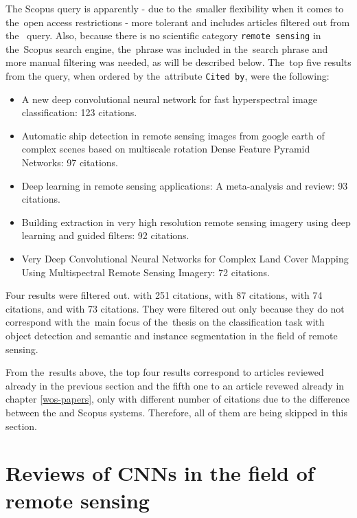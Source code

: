 \noindent The Scopus query is apparently - due to the~smaller flexibility when it comes to the~open access restrictions - more tolerant and includes articles filtered out from the~ query. Also, because there is no scientific category \verb|remote sensing| in the~Scopus search engine, the~phrase was included in the~search phrase and more manual filtering was needed, as will be described below. The~top five results from the query, when ordered by the~attribute \verb|Cited by|, were the following:

\begin{itemize}
	\item A new deep convolutional neural network for fast hyperspectral image classification: 123 citations.  \cite{cnn-hs-class}
	\item Automatic ship detection in remote sensing images from google earth of complex scenes based on multiscale rotation Dense Feature Pyramid Networks: 97 citations. \cite{ship-rdfpn}
	\item Deep learning in remote sensing applications: A meta-analysis and review: 93 citations. \cite{dl-remote-sensing-review}
	\item Building extraction in very high resolution remote sensing imagery using deep learning and guided filters: 92 citations. \cite{res-u-net}
	\item Very Deep Convolutional Neural Networks for Complex Land Cover Mapping Using Multispectral Remote Sensing Imagery: 72 citations. \cite{very-deep-cnn-lc}
\end{itemize}

Four results were filtered out. \cite{dl-for-cv} with 251 citations, \cite{dl-lungs} with 87 citations, \cite{maoxian-landslide} with 74 citations, and \cite{state-of-the-art-dl} with 73 citations. They were filtered out only because they do not correspond with the~main focus of the~thesis on the classification task with object detection and semantic and instance segmentation in the field of remote sensing.

From the~results above, the top four results correspond to articles reviewed already in the previous section and the fifth one to an article revewed already in chapter \ref{wos-papers}, only with different number of citations due to the difference between the  and Scopus systems. Therefore, all of them are being skipped in this section.

\section{Reviews of CNNs in the field of remote sensing}
\label{situation}

